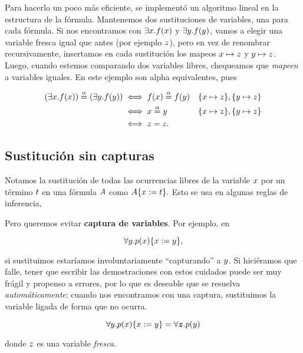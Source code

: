 Para hacerlo un poco más eficiente, se implementó un algoritmo lineal en la estructura de la fórmula. Mantenemos dos sustituciones de variables, una para cada fórmula. Si nos encontramos con $\exists x . f(x)$ y $\exists y . f(y)$, vamos a elegir una variable fresca igual que antes (por ejemplo $z$), pero en vez de renombrar recursivamente, insertamos en cada sustitución los mapeos $x \mapsto z$ y $y \mapsto z$. Luego, cuando estemos comparando dos variables libres, chequeamos que \textit{mapeen} a variables iguales. En este ejemplo son alpha equivalentes, pues

\begin{align*}
    (\exists x . f(x)) \overset{\alpha}{=} (\exists y . f(y))
    &\iff f(x) \overset{\alpha}{=} f(y)
        &&\{x \mapsto z\}, \{y \mapsto z\}\\
    &\iff x \overset{\alpha}{=} y
        &&\{x \mapsto z\}, \{y \mapsto z\}\\
    &\iff z = z.
\end{align*}

\subsection{Sustitución sin capturas}

Notamos la sustitución de todas las ocurrencias libres de la variable $x$ por un término $t$ en una fórmula $A$ como
\(
    A\{x := t\}.
\)
Esto se usa en algunas reglas de inferencia,

\proofTreeForallE

Pero queremos evitar \textbf{captura de variables}. Por ejemplo, en

\[
    \forall y . p(x)\{x := y\},
\]

si sustituimos  estaríamos involuntariamente ``capturando'' a $y$. Si hiciéramos que falle, tener que escribir las demostraciones con estos cuidados puede ser muy frágil y propenso a errores, por lo que es deseable que se resuelva \textit{automáticamente}: cuando nos encontramos con una captura, sustituimos la variable ligada de forma que no ocurra.

\[
    \forall y . p(x)\{x := y\} =
    \forall \bm{z} . p(y)
\]

donde $z$ es una variable \textit{fresca}.

